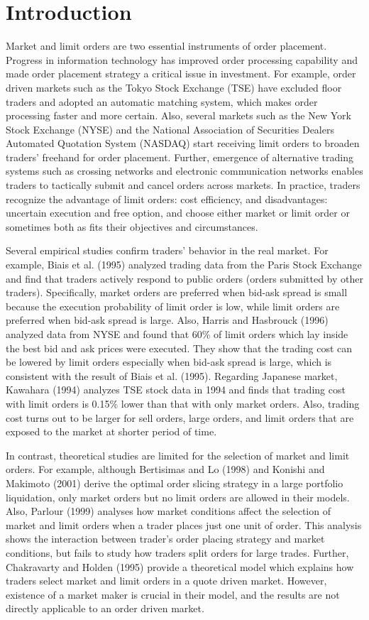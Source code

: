 \section{Introduction}\label{sec_l1}
Market and limit orders are two essential instruments of order placement.  Progress in information technology has improved order processing capability and made order placement strategy a critical issue in investment.  For example, order driven markets such as the Tokyo Stock Exchange (TSE) have excluded floor traders and adopted an automatic matching system, which makes order processing faster and more certain.  Also, several markets such as the New York Stock Exchange (NYSE) and the National Association of Securities Dealers Automated Quotation System (NASDAQ) start receiving limit orders to broaden traders' freehand for order placement.  Further, emergence of alternative trading systems such as crossing networks and electronic communication networks enables traders to tactically submit and cancel orders across markets.  In practice, traders recognize the advantage of limit orders: cost efficiency, and disadvantages: uncertain execution and free option, and choose either market or limit order or sometimes both as fits their objectives and circumstances.  

Several empirical studies confirm traders' behavior in the real market.  For example, Biais et al. (1995) analyzed trading data from the Paris Stock Exchange and find that traders actively respond to public orders (orders submitted by other traders).  Specifically, market orders are preferred when bid-ask spread is small because the execution probability of limit order is low, while limit orders are preferred when bid-ask spread is large.  Also, Harris and Hasbrouck (1996) analyzed data from NYSE and found that 60\% of limit orders which lay inside the best bid and ask prices were executed.  They show that the trading cost can be lowered by limit orders especially when bid-ask spread is large, which is consistent with the result of Biais et al. (1995).  Regarding Japanese market, Kawahara (1994) analyzes TSE stock data in 1994 and finds that trading cost with limit orders is 0.15\% lower than that with only market orders.  Also, trading cost turns out to be larger for sell orders, large orders, and limit orders that are exposed to the market at shorter period of time.

In contrast, theoretical studies are limited for the selection of market
and limit orders.  For example, although Bertisimas and Lo (1998) and Konishi and Makimoto (2001) derive the optimal order slicing strategy in a large portfolio liquidation, only market orders but no limit orders are allowed in their models.  Also, Parlour (1999) analyses how market conditions affect the selection of market and limit orders when a trader places just one unit of order.  This analysis shows the interaction between trader's order placing strategy and market conditions, but fails to study how traders split orders for large trades.  Further, Chakravarty and Holden (1995) provide a theoretical model which explains how traders select market and limit orders in a quote driven market.  However, existence of a market maker is crucial in their model, and the results are not directly applicable to an order driven market.

